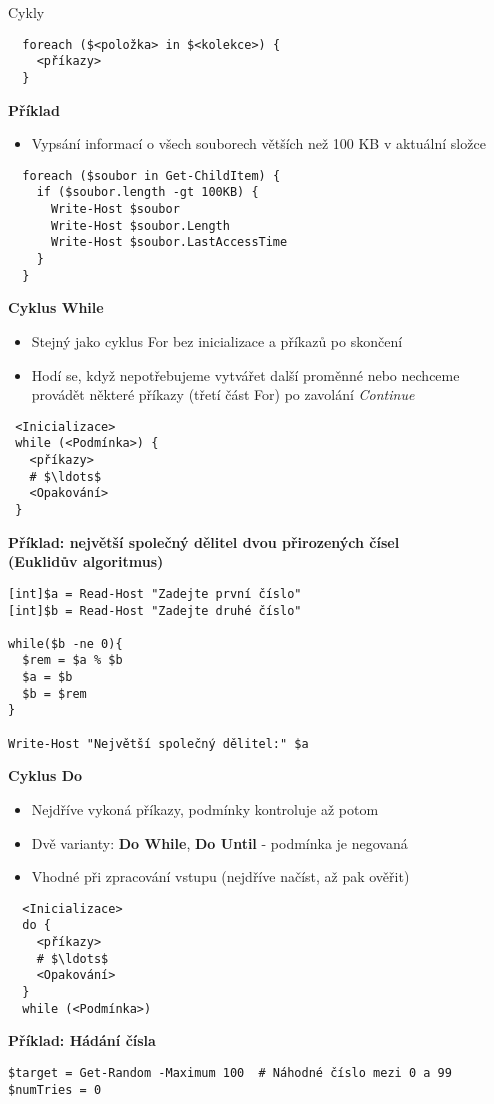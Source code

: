 \documentclass[main.tex]{subfiles}
\begin{document}
\begin{frame}{Cykly}
\begin{center}
      \begin{verbatim}
  foreach ($<položka> in $<kolekce>) {
    <příkazy>
  }
    \end{verbatim}
  \end{center}
     \textbf{Příklad}
     \begin{itemize}
       \item Vypsání informací o všech souborech větších než 100 KB v aktuální složce
     \end{itemize}
    \begin{verbatim}
  foreach ($soubor in Get-ChildItem) {
    if ($soubor.length -gt 100KB) {
      Write-Host $soubor
      Write-Host $soubor.Length
      Write-Host $soubor.LastAccessTime
    }
  }
     \end{verbatim}
 \framebreak
 \textbf{Cyklus While}
 \begin{itemize}
   \item Stejný jako cyklus For bez inicializace a příkazů po skončení
   \item Hodí se, když nepotřebujeme vytvářet další proměnné nebo nechceme provádět některé příkazy (třetí část For) po zavolání \textit{Continue}
 \end{itemize}
 \begin{center}
     \begin{verbatim}
 <Inicializace>
 while (<Podmínka>) {
   <příkazy>
   # $\ldots$
   <Opakování>
 }
     \end{verbatim}
 \end{center}
 \framebreak
 \textbf{Příklad: největší společný dělitel dvou přirozených čísel\\(Euklidův algoritmus)}
     \begin{verbatim}
[int]$a = Read-Host "Zadejte první číslo"
[int]$b = Read-Host "Zadejte druhé číslo"

while($b -ne 0){
  $rem = $a % $b
  $a = $b
  $b = $rem
}

Write-Host "Největší společný dělitel:" $a
     \end{verbatim}
\framebreak

\textbf{Cyklus Do}
\begin{itemize}
  \item Nejdříve vykoná příkazy, podmínky kontroluje až potom
  \item Dvě varianty: \textbf{Do While}, \textbf{Do Until} - podmínka je negovaná
  \item Vhodné při zpracování vstupu (nejdříve načíst, až pak ověřit)
\end{itemize}
\begin{center}
\begin{verbatim}
  <Inicializace>
  do {
    <příkazy>
    # $\ldots$
    <Opakování>
  }
  while (<Podmínka>)
  \end{verbatim}
\end{center}
\framebreak
\textbf{Příklad: Hádání čísla}
  \begin{verbatim}
$target = Get-Random -Maximum 100  # Náhodné číslo mezi 0 a 99
$numTries = 0 


\end{verbatim}
\end{frame}
\end{document}
